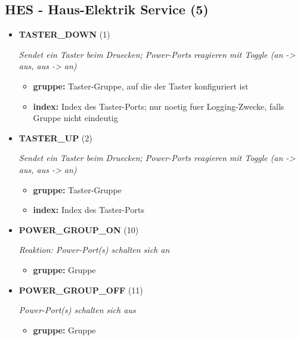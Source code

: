 \subsection{HES - Haus-Elektrik Service (5)}
\begin{itemize}
		
\item \textbf{TASTER\_DOWN} (1)

\textit{Sendet ein Taster beim Druecken; Power-Ports reagieren mit Toggle (an -> aus, aus -> an)}

\small
\begin{itemize}
		
\item \textbf{gruppe:} Taster-Gruppe, auf die der Taster konfiguriert ist
\item \textbf{index:} Index des Taster-Ports; nur noetig fuer Logging-Zwecke, falls Gruppe nicht eindeutig
\end{itemize}
\normalsize
	
\item \textbf{TASTER\_UP} (2)

\textit{Sendet ein Taster beim Druecken; Power-Ports reagieren mit Toggle (an -> aus, aus -> an)}

\small
\begin{itemize}
		
\item \textbf{gruppe:} Taster-Gruppe
\item \textbf{index:} Index des Taster-Ports
\end{itemize}
\normalsize
	
\item \textbf{POWER\_GROUP\_ON} (10)

\textit{Reaktion: Power-Port(s) schalten sich an}

\small
\begin{itemize}
		
\item \textbf{gruppe:} Gruppe
\end{itemize}
\normalsize
	
\item \textbf{POWER\_GROUP\_OFF} (11)

\textit{Power-Port(s) schalten sich aus}

\small
\begin{itemize}
		
\item \textbf{gruppe:} Gruppe
\end{itemize}
\normalsize
	

\end{itemize}
